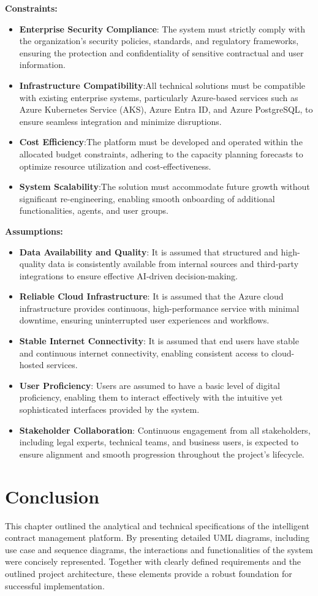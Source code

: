 \textbf{Constraints:}
\begin{itemize}
    \item \textbf{Enterprise Security Compliance}: The system must strictly comply with the organization’s security policies, standards, and regulatory frameworks, ensuring the protection and confidentiality of sensitive contractual and user information.
    \item \textbf{Infrastructure Compatibility}:All technical solutions must be compatible with existing enterprise systems, particularly Azure-based services such as Azure Kubernetes Service (AKS), Azure Entra ID, and Azure PostgreSQL, to ensure seamless integration and minimize disruptions.
    \item \textbf{Cost Efficiency}:The platform must be developed and operated within the allocated budget constraints, adhering to the capacity planning forecasts to optimize resource utilization and cost-effectiveness.
    \item \textbf{System Scalability}:The solution must accommodate future growth without significant re-engineering, enabling smooth onboarding of additional functionalities, agents, and user groups.
\end{itemize}

\textbf{Assumptions:}
\begin{itemize}
    \item \textbf{Data Availability and Quality}: It is assumed that structured and high-quality data is consistently available from internal sources and third-party integrations to ensure effective AI-driven decision-making.
    \item \textbf{Reliable Cloud Infrastructure}: It is assumed that the Azure cloud infrastructure provides continuous, high-performance service with minimal downtime, ensuring uninterrupted user experiences and workflows.
    \item \textbf{Stable Internet Connectivity}: It is assumed that end users have stable and continuous internet connectivity, enabling consistent access to cloud-hosted services.
    \item \textbf{User Proficiency}: Users are assumed to have a basic level of digital proficiency, enabling them to interact effectively with the intuitive yet sophisticated interfaces provided by the system.
    \item \textbf{Stakeholder Collaboration}: Continuous engagement from all stakeholders, including legal experts, technical teams, and business users, is expected to ensure alignment and smooth progression throughout the project’s lifecycle.
\end{itemize}

\section{Conclusion}
This chapter outlined the analytical and technical specifications of the intelligent contract management platform. By presenting detailed UML diagrams, including use case and sequence diagrams, the interactions and functionalities of the system were concisely represented. Together with clearly defined requirements and the outlined project architecture, these elements provide a robust foundation for successful implementation.